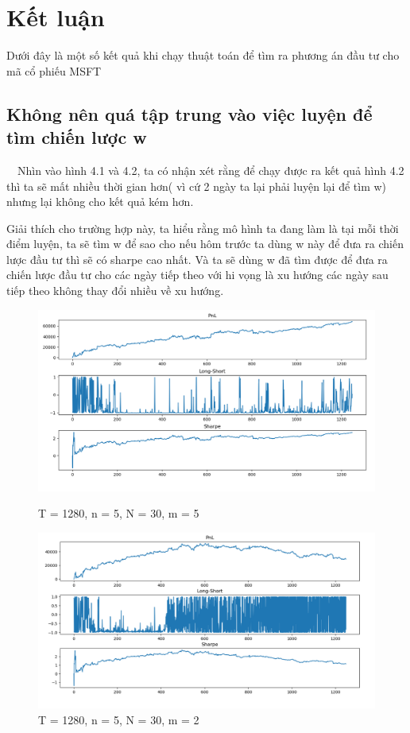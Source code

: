 \documentclass[14pt]{extreport}
\begin{document}
\chapter{Kết luận}

Dưới đây là một số kết quả khi chạy thuật toán để tìm ra phương án đầu tư cho mã cổ phiếu MSFT

\section{Không nên quá tập trung vào việc luyện để tìm chiến lược w}

$\quad$Nhìn vào hình 4.1 và 4.2, ta có nhận xét rằng để chạy được ra kết quả hình 4.2 thì ta sẽ mất nhiều thời gian hơn( vì cứ 2 ngày ta lại phải luyện lại để tìm w) nhưng lại không cho kết quả kém hơn.

Giải thích cho trường hợp này, ta hiểu rằng mô hình ta đang làm là tại mỗi thời điểm luyện, ta sẽ tìm w để sao cho nếu hôm trước ta dùng w này để đưa ra chiến lược đầu tư thì sẽ có sharpe cao nhất. Và ta sẽ dùng w đã tìm được để đưa ra chiến lược đầu tư cho các ngày tiếp theo với hi vọng là xu hướng các ngày sau tiếp theo không thay đổi nhiều về xu hướng.

\begin{center}
    \begin{figure}[htp]
    \begin{center}
     \includegraphics[scale=.5]{result_1-1}
    \end{center}
    \caption{T = 1280, n = 5, N = 30, m = 5}
    \begin{center}
     \includegraphics[scale=.5]{result_1-2}
    \end{center}
    \caption{T = 1280, n = 5, N = 30, m = 2}
    \end{figure}
\end{center} 
\end{document}
